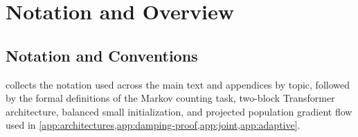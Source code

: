 \providecommand{\reg}[1]{\ensuremath{\mathsf{#1}}}

\section{Notation and Overview}
\label{app:map}
\label{app:formal}

\subsection{Notation and Conventions}

 collects the notation used across the main text and appendices by topic, followed by the formal definitions of the Markov counting task, two-block Transformer architecture, balanced small initialization, and projected population gradient flow used in \cref{app:architectures,app:damping-proof,app:joint,app:adaptive}.


